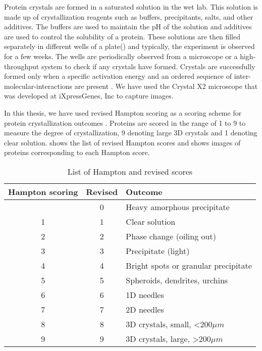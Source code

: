 Protein crystals are formed in a saturated solution in the wet lab. This solution is made up of crystallization reagents such as buffers, precipitants, salts, and other additives\cite{SamyamThesis}. The buffers are used to maintain the pH of the solution and additives are used to control the solubility of a protein. These solutions are then filled separately in different wells of a plate() and typically, the experiment is observed for a few weeks. The wells are periodically observed from a microscope or a high-throughput system to check if any crystals have formed\cite{microscope}. Crystals are successfully formed only when a specific activation energy and an ordered sequence of inter-molecular-interactions are present \cite{SamyamThesis,ActivationEnergy,InterMolecular}. We have used the Crystal X2 microscope \cite{sigdel:2013} that was developed at iXpressGenes, Inc to capture images.


In this thesis, we have used revised Hampton scoring\cite{Hampton} as a scoring scheme for protein crystallization outcomes \cite{dinc_protein_2015}. Proteins are scored in the range of 1 to 9 to measure the degree of crystallization, 9 denoting large 3D crystals and 1 denoting clear solution.  \cite{OptimizeAED} shows the list of revised Hampton scores and  shows images of proteins corresponding to each Hampton score. 
\begin{table}[h]
	\centering
    \caption{List of Hampton and revised scores}
    \label{tbl:hamptonScores}
    \begin{tabular} {|c| c| l |}
    \hline
    \textbf{Hampton scoring} & \textbf{Revised} & \textbf{Outcome} \\
    \hline
	 & 0 & Heavy amorphous precipitate \\
     \hline
     1 & 1 & Clear solution \\
     \hline
     2 & 2 & Phase change (oiling out) \\
     \hline
     3 & 3 & Precipitate (light) \\
     \hline
     4 & 4 & Bright spots or granular precipitate \\
     \hline
     5 & 5 & Spheroids, dendrites, urchins \\
     \hline
     6 & 6 & 1D needles \\
     \hline
     7 & 7 & 2D needles \\
     \hline
     8 & 8 & 3D crystals, small, \textless 200$\mu m$ \\
     \hline
     9 & 9 & 3D crystals, large, \textgreater 200$\mu m$ \\
     \hline
    \end{tabular}
\end{table}


